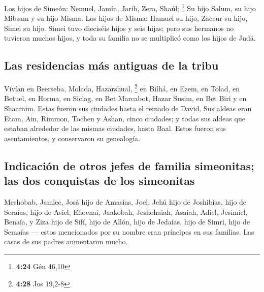 \begin{paracol}{2}
 Los hijos de Simeón: Nemuel, Jamín, Jarib, Zera, Shaúl;
\footnote{\textbf{4:24} Gén 46,10}  Su hijo Salum, su
hijo Mibsam y su hijo Misma.  Los hijos de Misma: Hamuel
su hijo, Zaccur su hijo, Simei su hijo.  Simei tuvo
dieciséis hijos y seis hijas; pero sus hermanos no tuvieron muchos
hijos, y toda su familia no se multiplicó como los hijos de Judá.

\hypertarget{las-residencias-muxe1s-antiguas-de-la-tribu}{%
\subsection{Las residencias más antiguas de la
tribu}\label{las-residencias-muxe1s-antiguas-de-la-tribu}}

 Vivían en Beerseba, Molada, Hazarshual, \footnote{\textbf{4:28}
  Jos 19,2-8}  en Bilhá, en Ezem, en Tolad,
 en Betuel, en Horma, en Siclag,  en Bet
Marcabot, Hazar Susim, en Bet Biri y en Shaaraim. Estas fueron sus
ciudades hasta el reinado de David.  Sus aldeas eran
Etam, Ain, Rimmon, Tochen y Ashan, cinco ciudades;  y
todas sus aldeas que estaban alrededor de las mismas ciudades, hasta
Baal. Estos fueron sus asentamientos, y conservaron su genealogía.

\hypertarget{indicaciuxf3n-de-otros-jefes-de-familia-simeonitas-las-dos-conquistas-de-los-simeonitas}{%
\subsection{Indicación de otros jefes de familia simeonitas; las dos
conquistas de los
simeonitas}\label{indicaciuxf3n-de-otros-jefes-de-familia-simeonitas-las-dos-conquistas-de-los-simeonitas}}

 Meshobab, Jamlec, Josá hijo de Amasías, 
Joel, Jehú hijo de Joshibías, hijo de Seraías, hijo de Asiel,
 Elioenai, Jaakobah, Jeshohaiah, Asaiah, Adiel, Jesimiel,
Benaía,  y Ziza hijo de Sifí, hijo de Allón, hijo de
Jedaías, hijo de Simri, hijo de Semaías ---  estos
mencionados por su nombre eran príncipes en sus familias. Las casas de
sus padres aumentaron mucho.


\end{paracol}
